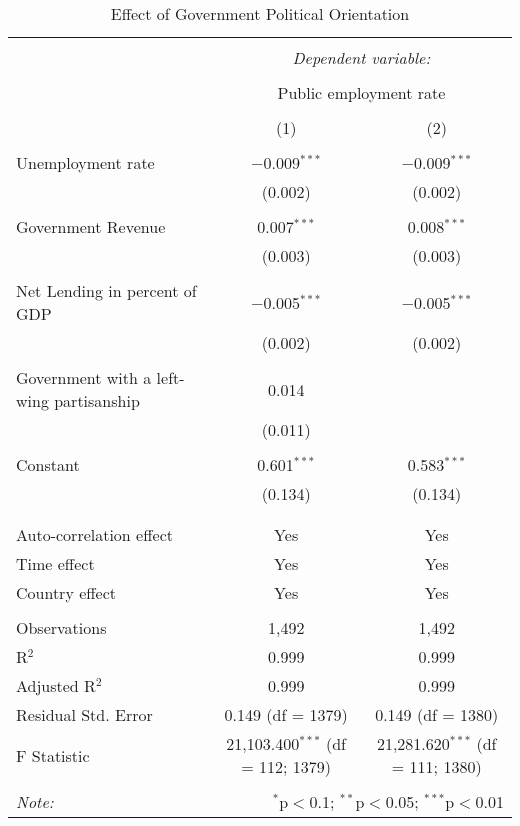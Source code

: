 \begin{table}[!htbp] \centering
  \caption{Effect of Government Political Orientation}
  \label{}
\begin{tabular}{@{\extracolsep{5pt}}lcc}
\\[-1.8ex]\hline
\hline \\[-1.8ex]
 & \multicolumn{2}{c}{\textit{Dependent variable:}} \\
\cline{2-3}
\\[-1.8ex] & \multicolumn{2}{c}{Public employment rate} \\
\\[-1.8ex] & (1) & (2)\\
\hline \\[-1.8ex]
 Unemployment rate & $-$0.009$^{***}$ & $-$0.009$^{***}$ \\
  & (0.002) & (0.002) \\
  & & \\
 Government Revenue & 0.007$^{***}$ & 0.008$^{***}$ \\
  & (0.003) & (0.003) \\
  & & \\
 Net Lending in percent of GDP & $-$0.005$^{***}$ & $-$0.005$^{***}$ \\
  & (0.002) & (0.002) \\
  & & \\
 Government with a left-wing partisanship & 0.014 &  \\
  & (0.011) &  \\
  & & \\
 Constant & 0.601$^{***}$ & 0.583$^{***}$ \\
  & (0.134) & (0.134) \\
  & & \\
\hline \\[-1.8ex]
Auto-correlation effect & Yes & Yes \\
Time effect & Yes & Yes \\
Country effect & Yes & Yes \\
\hline \\[-1.8ex]
Observations & 1,492 & 1,492 \\
R$^{2}$ & 0.999 & 0.999 \\
Adjusted R$^{2}$ & 0.999 & 0.999 \\
Residual Std. Error & 0.149 (df = 1379) & 0.149 (df = 1380) \\
F Statistic & 21,103.400$^{***}$ (df = 112; 1379) & 21,281.620$^{***}$ (df = 111; 1380) \\
\hline
\hline \\[-1.8ex]
\textit{Note:}  & \multicolumn{2}{r}{$^{*}$p$<$0.1; $^{**}$p$<$0.05; $^{***}$p$<$0.01} \\
\end{tabular}
\end{table}

